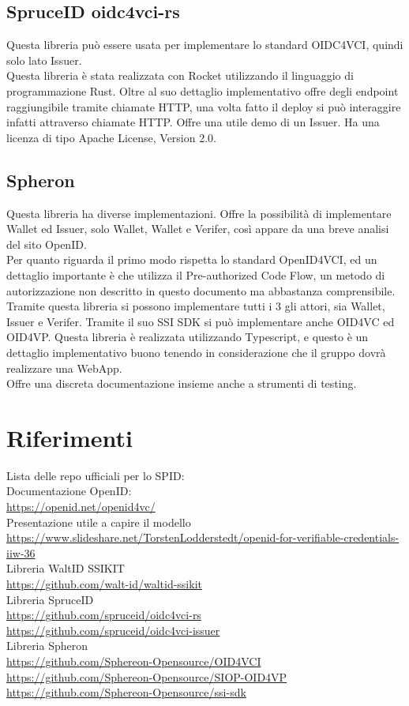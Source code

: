 \subsection*{SpruceID oidc4vci-rs}
Questa libreria può essere usata per implementare lo standard OIDC4VCI, quindi solo lato Issuer.\\
Questa libreria è stata realizzata con Rocket utilizzando il linguaggio di programmazione Rust.
Oltre al suo dettaglio implementativo offre degli endpoint raggiungibile tramite chiamate HTTP, 
una volta fatto il deploy si può interaggire infatti attraverso chiamate HTTP.
Offre una utile demo di un Issuer.
Ha una licenza di tipo  Apache License, Version 2.0.

\subsection{Spheron}
Questa libreria ha diverse implementazioni.
Offre la possibilità di implementare Wallet ed Issuer, solo Wallet, Wallet e Verifer, così appare da una breve analisi del sito OpenID.\\
Per quanto riguarda il primo modo rispetta lo standard OpenID4VCI, ed un dettaglio importante
è che utilizza il Pre-authorized Code Flow, un metodo di autorizzazione non descritto in questo documento ma abbastanza comprensibile.\\
Tramite questa libreria si possono implementare tutti i 3 gli attori, sia Wallet, Issuer e Verifer.
Tramite il suo SSI SDK si può implementare anche OID4VC ed OID4VP.
Questa libreria è realizzata utilizzando Typescript, e questo è un dettaglio implementativo buono tenendo in considerazione
che il gruppo dovrà realizzare una WebApp.\\
Offre una discreta documentazione insieme anche a strumenti di testing.\\



\section{Riferimenti}
Lista delle repo ufficiali per lo SPID:
\\ Documentazione OpenID:
\\ \url{https://openid.net/openid4vc/}
\\ Presentazione utile a capire il modello
\\ \url{https://www.slideshare.net/TorstenLodderstedt/openid-for-verifiable-credentials-iiw-36}
\\ Libreria WaltID SSIKIT
\\ \url{https://github.com/walt-id/waltid-ssikit}
\\ Libreria SpruceID
\\ \url{https://github.com/spruceid/oidc4vci-rs}
\\ \url{https://github.com/spruceid/oidc4vci-issuer}
\\ Libreria Spheron
\\ \url{https://github.com/Sphereon-Opensource/OID4VCI}
\\ \url{https://github.com/Sphereon-Opensource/SIOP-OID4VP}
\\ \url{https://github.com/Sphereon-Opensource/ssi-sdk}
